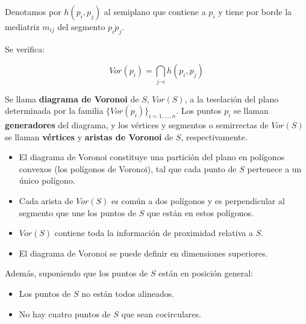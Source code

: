 \documentclass[twoside]{report}
\begin{document}
\vspace{-0.1cm}

Denotamos por $h(p_i,p_j)$ al semiplano que contiene a $p_i$ y
tiene por borde la mediatriz $m_{ij}$ del segmento
$\overline{p_ip_j}$.

\begin{lemma} Se verifica:

$$Vor(p_i)= \bigcap _{j\neg i} h(p_i,p_j)$$


\end{lemma}

\begin{defi} Se llama \textbf{diagrama de Voronoi} de $S$,
$Vor(S)$, a la teselación del plano determinada por la familia
$\{Vor(p_i)\}_{i=1,\dots,n}$. Los puntos $p_i$ se llaman \textbf{generadores} del diagrama, y los vértices y segmentos o
semirrectas de $Vor(S)$ se llaman \textbf{vértices} y \textbf{aristas de Voronoi} de $S$, respectivamente.
\end{defi}

\begin{nota}
\begin{itemize}

  \item El diagrama de Voronoi constituye una partición del plano en polígonos convexos (los polígonos de Voronoi), tal que cada punto de $S$ pertenece a un único polígono.

  \item Cada arista de $Vor(S)$ es común a dos polígonos y es perpendicular al segmento que une los puntos de $S$ que están en estos polígonos.

  \item $Vor(S)$ contiene toda la información de proximidad relativa a $S$.

  \item El diagrama de Voronoi se puede definir en dimensiones superiores.

\end{itemize}
\end{nota}

\vspace{0.3cm}
\noindent Además, suponiendo que los puntos de $S$ están en posición general:

\begin{itemize}

  \item Los puntos de $S$ no están todos alineados.

  \item No hay cuatro puntos de $S$ que sean cocirculares.

\end{itemize}
\end{document}
